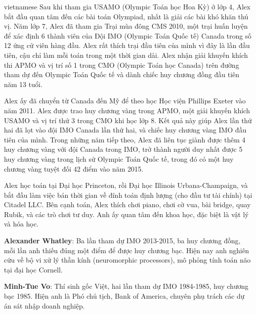 \documentclass{article}
\begin{document}
\begin{otherlanguage*}{vietnamese}
Sau khi tham gia USAMO (Olympic Toán học Hoa Kỳ) ở lớp 4, Alex bắt đầu quan tâm đến các bài toán Olympiad, nhất là giải các bài khó khăn thú vị.
Năm lớp 7, Alex đã tham gia Trại mùa đông CMS 2010, một trại huấn luyện để xác định 6 thành viên của Đội IMO (Olympic Toán Quốc tế) Canada trong số 12 ứng cử viên hàng đầu.
Alex rất thích trại đầu tiên của mình vì đây là lần đầu tiên, cậu chỉ làm mỗi toán trong một thời gian dài.
Alex nhận giải khuyến khích thi APMO và vị trí số 1 trong CMO (Olympic Toán học Canada) trên đường tham dự đến Olympic Toán Quốc tế và dành chiếc huy chương đồng đầu tiên năm 13 tuổi.

Alex ấy đã chuyển từ Canada đến Mỹ để theo học Học viện Phillips Exeter vào năm 2011. Alex được trao huy chương vàng trong APMO, một giải khuyến khích USAMO và vị trí thứ 3 trong CMO khi học lớp 8.
Kết quả này giúp Alex lần thứ hai đã lọt vào đội IMO Canada lần thứ hai, và chiếc huy chương vàng IMO đầu tiên của mình.
Trong những năm tiếp theo, Alex đã liên tục giành được thêm 4 huy chương vàng với đội Canada trong IMO, trở thành người duy nhất được 5 huy chương vàng trong lịch sử Olympic Toán Quốc tế,
trong đó có một huy chương vàng tuyệt đối 42 điểm vào năm 2015.

Alex học toán tại Đại học Princeton, rồi Đại học Illinois Urbana-Champaign, và bắt đầu làm việc bán thời gian về đính toán định lượng (cho đầu tư tài chính) tại Citadel LLC.
Bên cạnh toán, Alex thích chơi piano, chơi cờ vua, bài bridge, quay Rubik, và các trò chơi tư duy. Anh ấy quan tâm đến khoa học, đặc biệt là vật lý và hóa học.

\textbf{Alexander Whatley}: Ba lần tham dự IMO 2013-2015, ba huy chương đồng, mỗi lần anh thiếu đúng một điểm để được huy chương bạc.
Hiện nay anh nghiên cứu về bộ vi xử lý thần kính (neuromorphic processors), mô phỏng tính toán não tại đại học Cornell.

\textbf{Minh-Tue Vo}: Thí sinh gốc Việt, hai lần tham dự IMO 1984-1985, huy chương bạc 1985. Hiện anh là Phó chủ tịch, Bank of America, chuyên phụ trách các dự án sát nhập doanh nghiệp.

\end{otherlanguage*}
\end{document}

